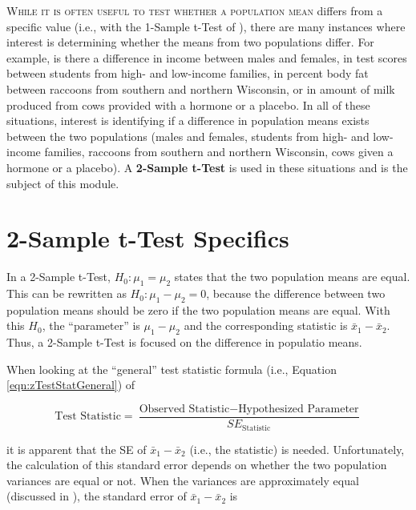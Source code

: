 \documentclass[10pt,openany]{book}\usepackage[]{graphicx}\usepackage[]{color}
\begin{document}
\minitoc
\vspace{24pt}

\lettrine{W}{hile it is often useful to test whether a population mean} differs from a specific value (i.e., with the 1-Sample t-Test of ), there are many instances where interest is determining whether the means from two populations differ. For example, is there a difference in income between males and females, in test scores between students from high- and low-income families, in percent body fat between raccoons from southern and northern Wisconsin, or in amount of milk produced from cows provided with a hormone or a placebo.  In all of these situations, interest is identifying if a difference in population means exists between the two populations (males and females, students from high- and low-income families, raccoons from southern and northern Wisconsin, cows given a hormone or a placebo).  A \textbf{2-Sample t-Test} is used in these situations and is the subject of this module.

\section{2-Sample t-Test Specifics}
\vspace{-12pt}
In a 2-Sample t-Test, $H_{0}:\mu_{1}=\mu_{2}$ states that the two population means are equal.  This can be rewritten as $H_{0}:\mu_{1}-\mu_{2}=0$, because the difference between two population means should be zero if the two population means are equal.  With this $H_{0}$, the ``parameter'' is $\mu_{1}-\mu_{2}$ and the corresponding statistic is $\bar{x}_{1}-\bar{x}_{2}$. Thus, a 2-Sample t-Test is focused on the difference in populatio means.


When looking at the ``general'' test statistic formula (i.e., Equation \eqref{eqn:zTestStatGeneral}) of

\[ \text{Test Statistic} = \frac{\text{Observed Statistic}-\text{Hypothesized Parameter}}{SE_{\text{Statistic}}} \]

it is apparent that the SE of $\bar{x}_{1}-\bar{x}_{2}$ (i.e., the statistic) is needed.  Unfortunately, the calculation of this standard error depends on whether the two population variances are equal or not.  When the variances are approximately equal (discussed in ), the standard error of $\bar{x}_{1}-\bar{x}_{2}$ is
\end{document}
